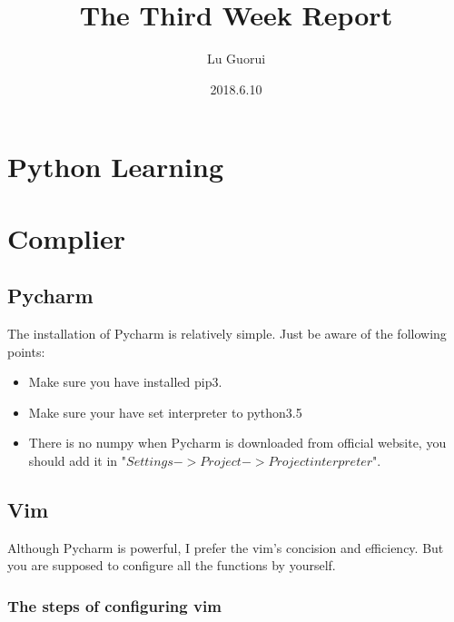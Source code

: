 \documentclass{article}
\title{The Third Week Report}
\author{Lu Guorui}
\date{2018.6.10}
\begin{document}
\maketitle
\tableofcontents

\newpage


\section*{Python Learning}

\section{Complier}
\subsection{Pycharm}
The installation of Pycharm is relatively simple. Just be aware of the following points:
\begin{itemize}
\item Make sure you have installed pip3.
\item Make sure your have set interpreter to python3.5
\item There is no numpy when Pycharm is downloaded from official website, you should add it in "$Settings -> Project -> Project interpreter$". 
\end{itemize}

\subsection{Vim}
Although Pycharm is powerful, I prefer the vim's concision and efficiency. But you are supposed to configure all the functions by yourself.

\subsubsection{The steps of configuring vim \protect\footnotemark[1]}

\end{document}
